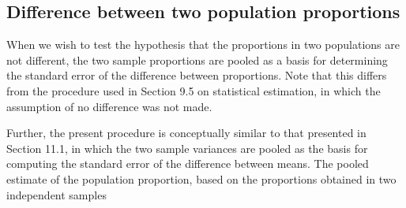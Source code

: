 

\subsection{Difference between two population proportions}
When we wish to test the hypothesis that the proportions in two
populations are not different, the two sample proportions are
pooled as a basis for determining the standard error of the
difference between proportions. Note that this differs from the
procedure used in Section 9.5 on statistical estimation, in which
the assumption of no difference was not made.

Further, the present procedure is conceptually similar to that
presented in Section 11.1, in which the two sample variances are
pooled as the basis for computing the standard error of the
difference between means. The pooled estimate of the population
proportion, based on the proportions obtained in two independent
samples